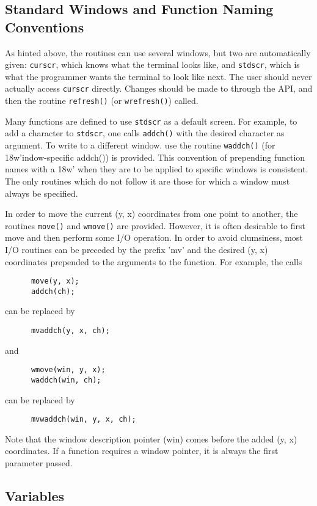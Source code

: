 \subsection{Standard Windows and Function Naming Conventions}

\label{f0:stdscr}As hinted above, the routines can use several windows, but two are
automatically given: \texttt{curscr}, which knows what the terminal looks like,
and \texttt{stdscr}, which is what the programmer wants the terminal to look
like next.  The user should never actually access \texttt{curscr} directly.
Changes should be made to through the API, and then the routine
\texttt{refresh()} (or \texttt{wrefresh()}) called. 

Many functions are defined to use \texttt{stdscr} as a default screen.  For
example, to add a character to \texttt{stdscr}, one calls \texttt{addch()} with
the desired character as argument.  To write to a different window. use the
routine \texttt{waddch()} (for \char18w'indow-specific addch()) is provided.  This
convention of prepending function names with a \char18w' when they are to be
applied to specific windows is consistent.  The only routines which do not
follow it are those for which a window must always be specified. 

In order to move the current (y, x) coordinates from one point to another, the
routines \texttt{move()} and \texttt{wmove()} are provided.  However, it is
often desirable to first move and then perform some I/O operation.  In order to
avoid clumsiness, most I/O routines can be preceded by the prefix 'mv' and
the desired (y, x) coordinates prepended to the arguments to the function.  For
example, the calls
\begin{verbatim} 	  move(y, x);
	  addch(ch);
\end{verbatim}
can be replaced by
\begin{verbatim} 	  mvaddch(y, x, ch);
\end{verbatim}
and
\begin{verbatim} 	  wmove(win, y, x);
	  waddch(win, ch);
\end{verbatim}
can be replaced by
\begin{verbatim} 	  mvwaddch(win, y, x, ch);
\end{verbatim}
Note that the window description pointer (win) comes before the added (y, x)
coordinates.  If a function requires a window pointer, it is always the first
parameter passed.

\subsection{Variables}

